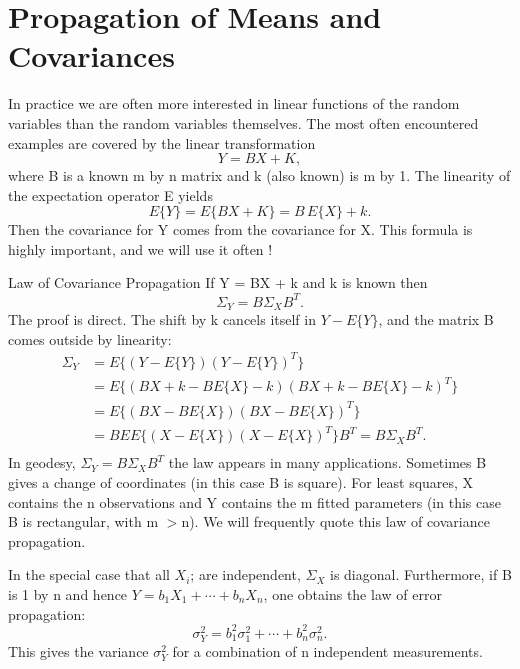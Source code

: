 \section{Propagation of Means and Covariances}
In practice we are often more interested in linear functions of the random variables than
the random variables themselves. The most often encountered examples are covered by the linear transformation
\begin{equation*}
Y=BX+K,
\end{equation*}
where B is a known m by n matrix and k (also known) is m by 1. The linearity of the
expectation operator E yields
\begin{equation}
E\{Y\}=E\{BX+K\}=B\,E\{X\}+k.
\end{equation}
Then the covariance for Y comes from the covariance for X. This formula is highly important, and we will use it often !

Law of Covariance Propagation If Y = BX + k  and k is known then
\begin{equation}
\Sigma_Y=B\Sigma_XB^T.
\end{equation}
The proof is direct. The shift by k cancels itself in $Y-E\{Y\}$, and the matrix B comes
outside by linearity:
\begin{equation*}
\begin{split}
\Sigma_Y&=E\{(Y-E\{Y\})(Y-E\{Y\})^T\}\\
&=E\{(BX+k-BE\{X\}-k)(BX+k-BE\{X\}-k)^T\}\\
&=E\{(BX-BE\{X\})(BX-BE\{X\})^T\}\\
&=BEE\{(X-E\{X\})(X-E\{X\})^T\}B^T=B\Sigma_XB^T.\\
\end{split}
\end{equation*} 
In geodesy, $\Sigma_Y=B\Sigma_XB^T$ the law appears in many applications. Sometimes B gives
a change of coordinates (in this case B is square). For least squares, X contains the n
observations and Y contains the m fitted parameters (in this case B is rectangular, with
m $>$n). We will frequently quote this law of covariance propagation.

In the special case that all $X_i$; are independent, $\Sigma_X$ is diagonal. Furthermore, if B is 1 by n and hence $Y=b_1X_1+\cdots+b_nX_n$, one obtains the law of error propagation: 
\begin{equation}
\sigma^2_Y=b^2_1\sigma^2_1+\cdots+b^2_n\sigma^2_n.
\end{equation}
This gives the variance $\sigma^2_Y$ for a combination of n independent measurements.

